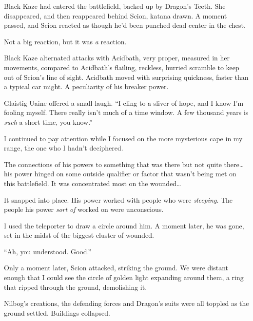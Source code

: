 Black Kaze had entered the battlefield, backed up by Dragon's Teeth.  She disappeared, and then reappeared behind Scion, katana drawn.  A moment passed, and Scion reacted as though he'd been punched dead center in the chest.



Not a big reaction, but it was \emph{a} reaction.



Black Kaze alternated attacks with Acidbath, very proper, measured in her movements, compared to Acidbath's flailing, reckless, hurried scramble to keep out of Scion's line of sight.  Acidbath moved with surprising quickness, faster than a typical car might.  A peculiarity of his breaker power.



Glaistig Uaine offered a small laugh.  ``I cling to a sliver of hope, and I know I'm fooling myself.  There really isn't much of a time window.  A few thousand years is \emph{such} a short time, you know.''



I continued to pay attention while I focused on the more mysterious cape in my range, the one who I hadn't deciphered.



The connections of his powers to something that was there but not quite there\ldots his power hinged on some outside qualifier or factor that wasn't being met on this battlefield.  It was concentrated most on the wounded\ldots



It snapped into place.  His power worked with people who were \emph{sleeping}.  The people his power \emph{sort of }worked on were unconscious.



I used the teleporter to draw a circle around him.  A moment later, he was gone, set in the midst of the biggest cluster of wounded.



``Ah, you understood.  Good.''



Only a moment later, Scion attacked, striking the ground.  We were distant enough that I could see the circle of golden light expanding around them, a ring that ripped through the ground, demolishing it.



Nilbog's creations, the defending forces and Dragon's suits were all toppled as the ground settled.  Buildings collapsed.



